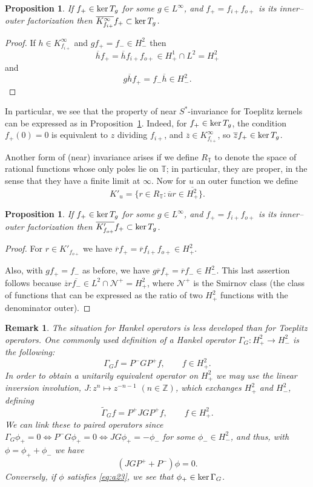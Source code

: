 \documentclass[11pt]{article}
\newtheorem{prop}[thm]{Proposition}
\newtheorem{rem}[thm]{Remark}
\def\GN{\mathcal N}
\def\TT{\mathbb T}
\def\ZZ{\mathbb Z}
\def\beq{\begin{equation}}
\def\eeq{\end{equation}}
\def\ol{\overline}
\def\wt{\widetilde}
\def\ker{\mathop{\rm ker}\nolimits}
\begin{document}
\begin{prop}\label{prop:2.4jul30}
If  $f_+ \in \ker T_g$ for some $g \in L^\infty$, and $f_+=f_{i+}f_{o+}$ is its inner--outer factorization
then $\ol{K^\infty _{{f_{i+}}} }f_+ \subset \ker T_g$.
\end{prop}
\begin{proof}
If
$h \in K^\infty _{{f_{i+}}}$ and $g f_+ = f_- \in H^2_-$ then 
\[
\ol h f_+ = \ol h f_{i+} f_{o+} \in H^1_+ \cap L^2=H^2_+
\]
 and
\[
 g \ol h f_+ = f_- \ol h \in H^2_-.
\]
\end{proof}

In particular, we see that the property of near $S^*$-invariance for Toeplitz kernels can be expressed as in Proposition~\ref{prop:2.4jul30}. Indeed, for $f_+ \in \ker T_g$, the condition $f_+(0)=0$ is equivalent to
$z$ dividing $f_{i+}$, and $\ol z \in K^\infty_{f_{i+}}$, so $\ol z f_+ \in \ker T_g$.

Another form of (near) invariance arises if we define $R_\TT$ to denote the space of rational functions whose
only poles lie on $\TT$; in particular, they are proper, in the sense that they have a finite limit at $\infty$.
Now for $u$ an outer function we define
\[ 
 K'_u = \{ r \in R_\TT: \ol u r \in \ol{H^2_+} \}.
\]
\begin{prop}
If  $f_+ \in \ker T_g$ for some $g \in L^\infty$, and $f_+=f_{i+}f_{o+}$ is its inner--outer factorization
then $\ol{K'_{f_{o+}}} f_+ \subset \ker T_g$.
\end{prop}
\begin{proof}
For $r \in K'_{f_{o+}}$ we have 
$\ol r f_+ = \ol r f_{i+}f_{o+} \in H^2_+$.

Also, with $g f_+=f_-$ as before, we have
$g \ol r f_+= \ol r f_- \in H^2_-$. This last assertion follows because $\ol z r  \ol{f_-} \in L^2 \cap \GN^+ = H^2_+$,
where $\GN^+$ is the Smirnov class (the class of functions that can be expressed as the ratio of two $H^2_+$ functions with the denominator outer).
\end{proof}



\begin{rem}{\rm
The situation for Hankel operators is less developed than
for Toeplitz operators. One commonly used definition of a Hankel operator
$\Gamma_G: H^2_+ \to H^2_-$ is the following:
\[
\Gamma_G f = P^- G P^+ f, \qquad f \in H^2_+.
\]
In order to obtain a unitarily equivalent operator on $H^2_+$ we may use
 the linear inversion involution, $J: z^n \mapsto z^{-n-1}$ $(n \in \ZZ)$, which exchanges $H^2_+$ and $H^2_-$, defining
 \[
 \wt \Gamma_G f = P^+ J G P^+ f, \qquad f \in H^2_+.
 \]
 We can link these to paired operators
since $\Gamma_G \phi_+=0 \iff P^- G\phi_+=0 \iff JG \phi_+= -\phi_-$ for some $\phi_- \in H^2_-$,
and thus, with $\phi=\phi_+ + \phi_-$ we have
\beq\label{eq:a23}
(JG P^+ + P^-)\phi=0.
\eeq
Conversely, if $\phi$ satisfies \eqref{eq:a23}, we see that $\phi_+ \in \ker \Gamma_G$.
}
\end{rem}
\end{document}
